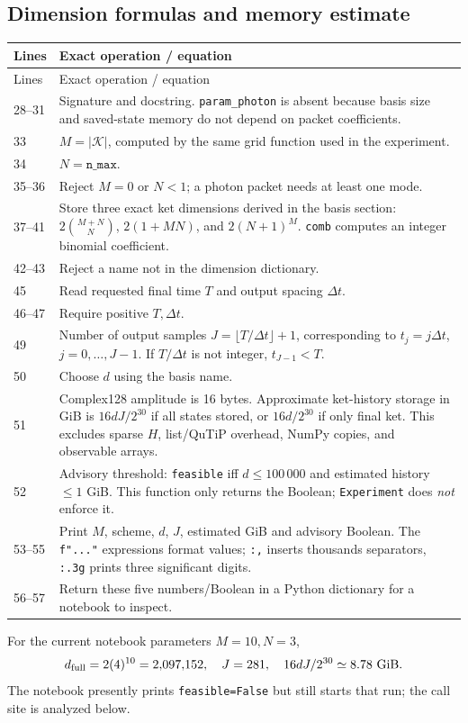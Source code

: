 \documentclass[11pt,a4paper]{article}
\newcommand{\code}[1]{\nolinkurl{#1}}
\begin{document}
\subsection{Dimension formulas and memory estimate}

\begin{longtable}{p{}p{}}
\toprule Lines & Exact operation / equation\\\midrule\endfirsthead
\toprule Lines & Exact operation / equation\\\midrule\endhead
28--31 & Signature and docstring. \code{param_photon} is absent because basis size and saved-state memory do not depend on packet coefficients.\\
33 & $M=|\mathcal K|$, computed by the same grid function used in the experiment.\\
34 & $N=\texttt{n\_max}$.\\
35--36 & Reject $M=0$ or $N<1$; a photon packet needs at least one mode.\\
37--41 & Store three exact ket dimensions derived in the basis section: $2\binom{M+N}{N}$, $2(1+MN)$, and $2(N+1)^M$. \code{comb} computes an integer binomial coefficient.\\
42--43 & Reject a name not in the dimension dictionary.\\
45 & Read requested final time $T$ and output spacing $\Delta t$.\\
46--47 & Require positive $T,\Delta t$.\\
49 & Number of output samples $J=\lfloor T/\Delta t\rfloor+1$, corresponding to $t_j=j\Delta t$, $j=0,\ldots,J-1$. If $T/\Delta t$ is not integer, $t_{J-1}<T$.\\
50 & Choose $d$ using the basis name.\\
51 & Complex128 amplitude is 16 bytes. Approximate ket-history storage in GiB is $16dJ/2^{30}$ if all states stored, or $16d/2^{30}$ if only final ket. This excludes sparse $H$, list/QuTiP overhead, NumPy copies, and observable arrays.\\
52 & Advisory threshold: \code{feasible} iff $d\le100\,000$ and estimated history $\le1$ GiB. This function only returns the Boolean; \code{Experiment} does \emph{not} enforce it.\\
53--55 & Print $M$, scheme, $d$, $J$, estimated GiB and advisory Boolean. The \code{f"..."} expressions format values; \code{:,} inserts thousands separators, \code{:.3g} prints three significant digits.\\
56--57 & Return these five numbers/Boolean in a Python dictionary for a notebook to inspect.\\
\bottomrule
\end{longtable}
For the current notebook parameters $M=10,N=3$,
\[
d_{\rm full}=2(4)^{10}=2{,}097{,}152,\quad
J=281,\quad
16dJ/2^{30}\simeq8.78\ {\rm GiB}.
\]
The notebook presently prints \code{feasible=False} but still starts that run;
the call site is analyzed below.
\end{document}
